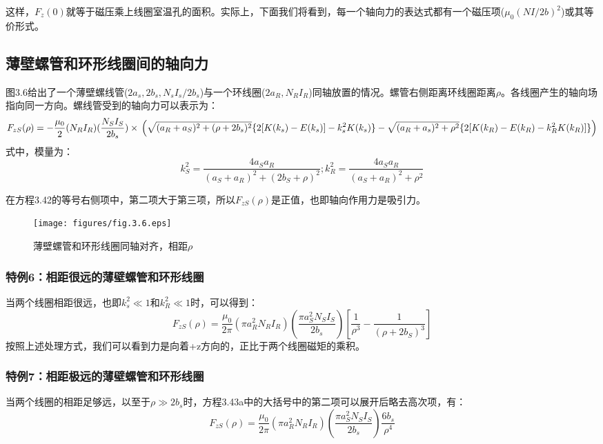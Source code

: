 这样，$F_z(0)$就等于磁压乘上线圈室温孔的面积。实际上，下面我们将看到，每一个轴向力的表达式都有一个磁压项($\mu_0(NI/2b)^2$)或其等价形式。

\subsection{薄壁螺管和环形线圈间的轴向力}
图3.6给出了一个薄壁螺线管($2a_s,2b_s,N_s I_s/2b_s$)与一个环线圈($2a_R,N_R I_R$)同轴放置的情况。螺管右侧距离环线圈距离$\rho$。各线圈产生的轴向场指向同一方向。螺线管受到的轴向力可以表示为：
\begin{equation}
F_{zS}(\rho)=-\frac{\mu_0}{2}(N_R I_R)(\frac{N_S I_S}{2b_s})\times\\
\left(\sqrt{(a_R+a_S)^2+(\rho+2b_s)^2}\{2[K(k_s)-E(k_s)]-k_s^2K(k_s)\}\\
-\sqrt{(a_R+a_s)^2+\rho^2}\{2[K(k_R)-E(k_R)-k_R^2K(k_R)]\}\right)
\end{equation}
式中，模量为：
$$k_{S}^2=\frac{4a_S a_R}{(a_S+a_R)^2+(2b_S+\rho)^2} ; k_{R}^2=\frac{4a_S a_R}{(a_S+a_R)^2+\rho^2} $$

在方程3.42的等号右侧项中，第二项大于第三项，所以$F_{zS}(\rho)$是正值，也即轴向作用力是吸引力。
\begin{figure}[htbp]
	\centering
	\texttt{[image: figures/fig.3.6.eps]}
	\caption{薄壁螺管和环形线圈同轴对齐，相距$\rho$}
\end{figure}

\subsubsection{特例6：相距很远的薄壁螺管和环形线圈}
当两个线圈相距很远，也即$k_s^2\ll 1$和$k_R^2\ll 1$时，可以得到：
\begin{equation}
F_{zS}(\rho)=\frac{\mu_0}{2\pi}(\pi a_R^2N_R I_R)(\frac{\pi a_S^2 N_S I_S}{2 b_s})[\frac{1}{\rho^3}-\frac{1}{(\rho+2b_S)^3}]
\end{equation}
按照上述处理方式，我们可以看到力是向着+z方向的，正比于两个线圈磁矩的乘积。

\subsubsection{特例7：相距极远的薄壁螺管和环形线圈}
当两个线圈的相距足够远，以至于$\rho \gg 2b_s$时，方程3.43a中的大括号中的第二项可以展开后略去高次项，有：
\begin{equation}
F_{zS}(\rho)=\frac{\mu_0}{2\pi}(\pi a_R^2 N_R I_R)(\frac{\pi a_S^2 N_S I_S}{2 b_s})\frac{6b_s}{\rho^4}
\end{equation}

